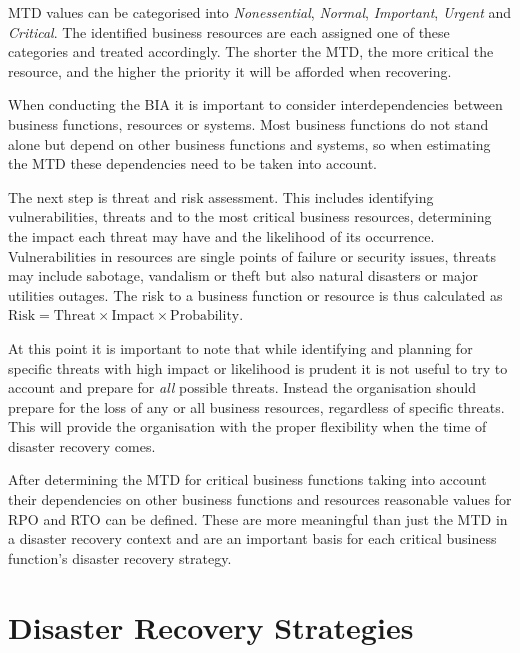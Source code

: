 \documentclass[a4paper,11pt,onecolumn]{scrartcl}
\begin{document}
MTD values can be categorised into \emph{Nonessential}, \emph{Normal},
\emph{Important}, \emph{Urgent} and \emph{Critical}. The identified
business resources are each assigned one of these categories and treated
accordingly. The shorter the MTD, the more critical the resource, and
the higher the priority it will be afforded when recovering.

When conducting the BIA it is important to consider interdependencies
between business functions, resources or systems. Most business
functions do not stand alone but depend on other business functions and
systems, so when estimating the MTD these dependencies need to be taken
into account. 

The next step is threat and risk assessment. This includes identifying
vulnerabilities, threats and to the most critical business resources,
determining the impact each threat may have and the likelihood of its
occurrence. Vulnerabilities in resources are single points of failure or
security issues, threats may include sabotage, vandalism or theft but
also natural disasters or major utilities outages. The risk to a
business function or resource is thus calculated as $\textrm{Risk} =
\textrm{Threat} \times \textrm{Impact} \times \textrm{Probability}$. 

At this point it is important to note that while identifying and
planning for specific threats with high impact or likelihood is prudent
it is not useful to try to account and prepare for \emph{all} possible
threats. Instead the organisation should prepare for the loss of any or
all business resources, regardless of specific threats. This will
provide the organisation with the proper flexibility when the time of
disaster recovery comes.

After determining the MTD for critical business functions taking into
account their dependencies on other business functions and resources
reasonable values for RPO and RTO can be defined. These are more
meaningful than just the MTD in a disaster recovery context and are an
important basis for each critical business function's disaster recovery
strategy.

\section{Disaster Recovery Strategies}
\end{document}
